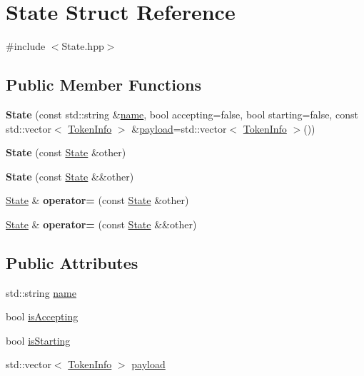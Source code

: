 \hypertarget{structState}{}\section{State Struct Reference}
\label{structState}


{\ttfamily \#include $<$State.\+hpp$>$}

\subsection*{Public Member Functions}
\begin{DoxyCompactItemize}
\item 
{\bfseries State} (const std\+::string \&\hyperlink{structState_ad57f19fd0a86f129840d8739253d2c72}{name}, bool accepting=false, bool starting=false, const std\+::vector$<$ \hyperlink{structTokenInfo}{Token\+Info} $>$ \&\hyperlink{structState_a19ea4225f19a3281e2d6c890b0c09312}{payload}=std\+::vector$<$ \hyperlink{structTokenInfo}{Token\+Info} $>$())\hypertarget{structState_aa9d973d416d8de54bc8234b35bf5d602}{}\label{structState_aa9d973d416d8de54bc8234b35bf5d602}

\item 
{\bfseries State} (const \hyperlink{structState}{State} \&other)\hypertarget{structState_a7325c890ee133fde5ca26eb4cea1f8ce}{}\label{structState_a7325c890ee133fde5ca26eb4cea1f8ce}

\item 
{\bfseries State} (const \hyperlink{structState}{State} \&\&other)\hypertarget{structState_add87bf8cfa231b793bb0aa908fabf008}{}\label{structState_add87bf8cfa231b793bb0aa908fabf008}

\item 
\hyperlink{structState}{State} \& {\bfseries operator=} (const \hyperlink{structState}{State} \&other)\hypertarget{structState_a57229f2db32144885eef8b7d8da598ef}{}\label{structState_a57229f2db32144885eef8b7d8da598ef}

\item 
\hyperlink{structState}{State} \& {\bfseries operator=} (const \hyperlink{structState}{State} \&\&other)\hypertarget{structState_ade935fb2b2db2cad19950bdefe374267}{}\label{structState_ade935fb2b2db2cad19950bdefe374267}

\end{DoxyCompactItemize}
\subsection*{Public Attributes}
\begin{DoxyCompactItemize}
\item 
std\+::string \hyperlink{structState_ad57f19fd0a86f129840d8739253d2c72}{name}
\item 
bool \hyperlink{structState_ab48af65a07f9ae4dfb880bacfbd2e812}{is\+Accepting}
\item 
bool \hyperlink{structState_a578fb1731639aab7ee201241ac00b728}{is\+Starting}
\item 
std\+::vector$<$ \hyperlink{structTokenInfo}{Token\+Info} $>$ \hyperlink{structState_a19ea4225f19a3281e2d6c890b0c09312}{payload}
\end{DoxyCompactItemize}


